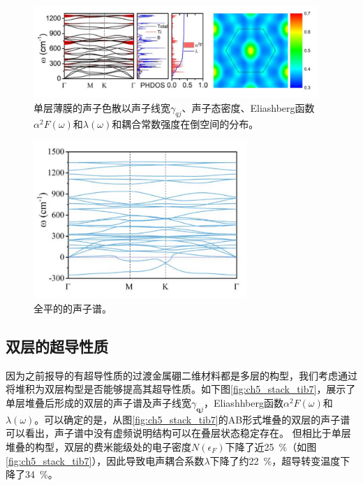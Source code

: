 \begin{figure}
  \includegraphics[width=0.96\textwidth]{figs/ch5_tib9_phonon.png}
  \centering
  \caption{单层薄膜的声子色散以声子线宽$\gamma_{qj}$、声子态密度、Eliashberg函数$\alpha^2 F(\omega)$和$\lambda(\omega)$和耦合常数强度在倒空间的分布。}
  \label{fig:ch5_tib9_phonon}
\end{figure}

\begin{figure}
  \includegraphics[width=0.72\textwidth]{figs/ch5_tib9_phonon_a.png}
  \centering
  \caption{全平的的声子谱。}
  \label{fig:ch5_tib9_phonon_a}
\end{figure}

\subsection{双层的超导性质}
因为之前报导的有超导性质的过渡金属硼二维材料都是多层的构型，我们考虑通过将堆积为双层构型是否能够提高其超导性质。如下图\ref{fig:ch5_stack_tib7}，展示了单层堆叠后形成的双层的声子谱及声子线宽$\gamma_{\bm{q}j}$，Eliashhberg函数$\alpha^2 F(\omega)$和$\lambda(\omega)$。可以确定的是，从图\ref{fig:ch5_stack_tib7}的AB形式堆叠的双层的声子谱可以看出，声子谱中没有虚频说明结构可以在叠层状态稳定存在。
但相比于单层堆叠的构型，双层的费米能级处的电子密度$N(\epsilon_F)$下降了近\SI{25}{\percent}（如图\ref{fig:ch5_stack_tib7}），因此导致电声耦合系数$\lambda$下降了约\SI{22}{\percent}，超导转变温度下降了\SI{34}{\percent}。

